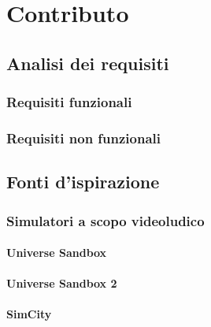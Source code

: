 

\chapter{Contributo}\label{ch:contributo}
  \section{Analisi dei requisiti}\label{sec:analisi}
    \subsection{Requisiti funzionali}\label{sub:funzionali}
    \subsection{Requisiti non funzionali}\label{sub:nonFunzionali}
  \section{Fonti d'ispirazione}\label{sec:ispirazione}
    \subsection{Simulatori a scopo videoludico}\label{sub:videogame}
      \subsubsection{Universe Sandbox}\label{subsub:us1}
      \subsubsection{Universe Sandbox 2}\label{subsub:us2}
      \subsubsection{SimCity}\label{subsub:simcity}
